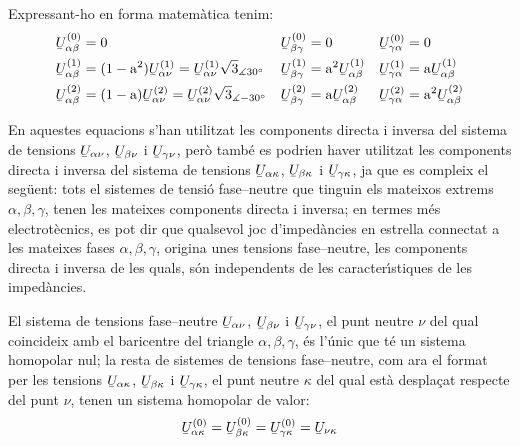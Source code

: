 Expressant-ho en forma matem\`{a}tica tenim:
\begin{subequations}
\begin{align}
   \cmplx{U}_{\alpha\beta}\ap{(0)} &= 0 &
   \cmplx{U}_{\beta\gamma}\ap{(0)} &= 0 &
   \cmplx{U}_{\gamma\alpha}\ap{(0)} &= 0 \\
   \cmplx{U}_{\alpha\beta}\ap{(1)} &= (1-\au^2) \cmplx{U}_{\alpha\nu}\ap{(1)} =
   \cmplx{U}_{\alpha\nu}\ap{(1)} \sqrt{3}_{\measuredangle 30\degree} &
   \cmplx{U}_{\beta\gamma}\ap{(1)} &= \au^2 \cmplx{U}_{\alpha\beta}\ap{(1)} &
   \cmplx{U}_{\gamma\alpha}\ap{(1)} &= \au \cmplx{U}_{\alpha\beta}\ap{(1)} \label{eq:c_sim_a3} \\
   \cmplx{U}_{\alpha\beta}\ap{(2)} &= (1-\au) \cmplx{U}_{\alpha\nu}\ap{(2)}  =
   \cmplx{U}_{\alpha\nu}\ap{(2)} \sqrt{3}_{\measuredangle -30\degree}&
   \cmplx{U}_{\beta\gamma}\ap{(2)} &= \au \cmplx{U}_{\alpha\beta}\ap{(2)} &
   \cmplx{U}_{\gamma\alpha}\ap{(2)} &= \au^2 \cmplx{U}_{\alpha\beta}\ap{(2)} \label{eq:c_sim_b3}
\end{align}
\end{subequations}

En aquestes equacions s'han utilitzat les components directa i
inversa del sistema de tensions
$\cmplx{U}_{\alpha\nu}$, $\cmplx{U}_{\beta\nu}$ i $\cmplx{U}_{\gamma\nu}$,
per\`{o} tamb\'{e} es podrien haver utilitzat les components directa i
inversa del sistema de tensions
$\cmplx{U}_{\alpha\kappa}$, $\cmplx{U}_{\beta\kappa}$ i $\cmplx{U}_{\gamma\kappa}$,
ja que es compleix el seg\"{u}ent: tots el sistemes de tensi\'{o}
fase--neutre que tinguin els mateixos extrems $\alpha, \beta,
\gamma$, tenen les mateixes components directa i inversa; en termes
m\'{e}s electrot\`{e}cnics, es pot dir que qualsevol joc d'imped\`{a}ncies en
estrella connectat a les mateixes fases $\alpha, \beta, \gamma$,
origina unes tensions fase--neutre, les components directa i inversa
de les quals, s\'{o}n independents de les caracter\'{\i}stiques de les
imped\`{a}ncies.

El sistema de tensions fase--neutre
$\cmplx{U}_{\alpha\nu}$, $\cmplx{U}_{\beta\nu}$ i $\cmplx{U}_{\gamma\nu}$,
el punt neutre $\nu$ del qual coincideix amb el baricentre del
triangle $\alpha, \beta,
 \gamma$, \'{e}s l'\'{u}nic que t\'{e} un sistema homopolar nul; la resta de sistemes de tensions
 fase--neutre, com ara el format per les tensions $\cmplx{U}_{\alpha\kappa}$, $\cmplx{U}_{\beta\kappa}$ i $\cmplx{U}_{\gamma\kappa}$,
 el punt neutre $\kappa$ del qual est\`{a} despla\c{c}at respecte del punt $\nu$, tenen un sistema
 homopolar de valor:
\begin{equation}
    \cmplx{U}_{\alpha\kappa}\ap{(0)} = \cmplx{U}_{\beta\kappa}\ap{(0)} =
    \cmplx{U}_{\gamma\kappa}\ap{(0)} = \cmplx{U}_{\nu\kappa}
\end{equation}

